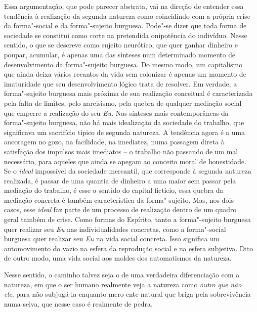Essa argumentação, que pode parecer abstrata, vai na direção de entender
essa tendência à realização da segunda natureza como coincidindo com a
própria crise da forma"-social e da forma"-sujeito burguesa. Pode"-se dizer
que toda forma de sociedade se constitui como corte na pretendida
onipotência do indivíduo. Nesse sentido, o que se descreve como sujeito
neurótico, que quer ganhar dinheiro e poupar, acumular, é apenas uma das
sínteses num determinado momento de desenvolvimento da forma"-sujeito
burguesa. Do mesmo modo, um capitalismo que ainda deixa vários recantos
da vida sem colonizar é apenas um momento de imaturidade que seu
desenvolvimento lógico trata de resolver. Em verdade, a forma"-sujeito
burguesa mais próxima de sua realização conceitual é caracterizada pela
falta de limites, pelo narcisismo, pela quebra de qualquer mediação
social que emperre a realização do seu \emph{Eu.} Nas sínteses mais
contemporâneas da forma"-sujeito burguesa, não há mais idealização da
sociedade do trabalho, que significava um sacrifício típico de segunda
natureza. A tendência agora é a uma ancoragem no gozo, na facilidade, na
imediatez, numa passagem direta à satisfação dos impulsos mais imediatos
-- o trabalho não passando de um mal necessário, para aqueles que ainda
se apegam ao conceito moral de honestidade. Se o \emph{ideal} impossível
da sociedade mercantil, que corresponde à segunda natureza realizada, é
passar de uma quantia de dinheiro a uma maior sem passar pela mediação
do trabalho, é esse o sentido do capital fictício, essa quebra da
mediação concreta é também característica da forma"-sujeito. Mas, nos
dois casos, esse \emph{ideal} faz parte de um processo de realização
dentro de um quadro geral também de crise. Como formas do Espírito,
tanto a forma"-sujeito burguesa quer realizar seu \emph{Eu} nas
individualidades concretas, como a forma"-social burguesa quer realizar
seu \emph{Eu} na vida social concreta. Isso significa um automovimento
do vazio na esfera da reprodução social e na esfera subjetiva. Dito de
outro modo, uma vida social aos moldes dos automatismos da natureza.

Nesse sentido, o caminho talvez seja o de uma verdadeira diferenciação
com a natureza, em que o ser humano realmente veja a natureza como
\emph{outro que não ele}, para não subjugá-la enquanto mero ente natural
que briga pela sobrevivência numa selva, que nesse caso é realmente de
pedra.

